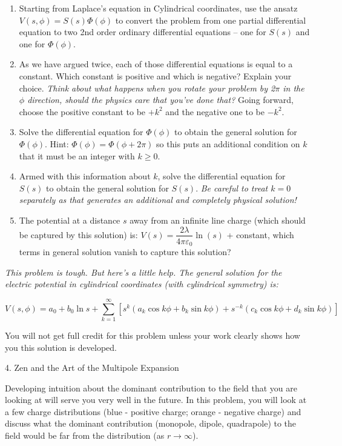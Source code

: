 \documentclass[11pt]{article}
\def\tightlist{}
\begin{document}
\begin{enumerate}
\def\labelenumi{\arabic{enumi}.}
\tightlist
\item
  Starting from Laplace's equation in Cylindrical coordinates, use the
  ansatz \(V(s,\phi) = S(s)\Phi(\phi)\) to convert the problem from one
  partial differential equation to two 2nd order ordinary differential
  equations -- one for \(S(s)\) and one for \(\Phi(\phi)\).
\item
  As we have argued twice, each of those differential equations is equal
  to a constant. Which constant is positive and which is negative?
  Explain your choice. \emph{Think about what happens when you rotate
  your problem by 2\(\pi\) in the \(\phi\) direction, should the physics
  care that you've done that?} Going forward, choose the positive
  constant to be \(+k^2\) and the negative one to be \(-k^2\).
\item
  Solve the differential equation for \(\Phi(\phi)\) to obtain the
  general solution for \(\Phi(\phi)\). Hint:
  \(\Phi(\phi) = \Phi(\phi + 2\pi)\) so this puts an additional
  condition on \(k\) that it must be an integer with \(k \geq 0\).
\item
  Armed with this information about \(k\), solve the differential
  equation for \(S(s)\) to obtain the general solution for \(S(s)\).
  \emph{Be careful to treat \(k=0\) separately as that generates an
  additional and completely physical solution!}
\item
  The potential at a distance \(s\) away from an infinite line charge
  (which should be captured by this solution) is:
  \(V(s) = \dfrac{2\lambda}{4 \pi\varepsilon_0}\ln(s)\) + constant,
  which terms in general solution vanish to capture this solution?
\end{enumerate}

\emph{This problem is tough. But here's a little help. The general
solution for the electric potential in cylindrical coordinates (with
cylindrical symmetry) is:}

\[V(s,\phi) = a_0 + b_0 \ln s + \sum_{k=1}^\infty \left[s^k(a_k \cos k\phi + b_k \sin k \phi)+s^{-k}(c_k \cos k\phi + d_k \sin k \phi)\right]\]

You will not get full credit for this problem unless your work clearly
shows how you this solution is developed.

{\Large 4. Zen and the Art of the Multipole
Expansion}\label{zen-and-the-art-of-the-multipole-expansion}

Developing intuition about the dominant contribution to the field that
you are looking at will serve you very well in the future. In this
problem, you will look at a few charge distributions (blue - positive
charge; orange - negative charge) and discuss what the dominant
contribution (monopole, dipole, quadrapole) to the field would be far
from the distribution (as \(r \rightarrow \infty\)).
\end{document}
